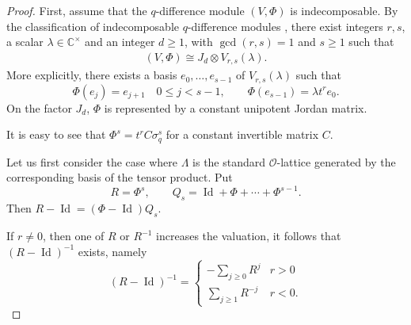 \documentclass[11pt]{amsart}
\numberwithin{equation}{section}
\theoremstyle{definition}
\theoremstyle{remark}
\begin{document}
\begin{proof}
 First, assume that the $q$-difference module $(V,\Phi)$ is indecomposable. By the classification of indecomposable $q$-difference modules \cite[Theorem~2.4]{Liu}, there exist integers $r,s$, a scalar $\lambda\in\mathbb{C}^{\times}$ and an integer $d\geq 1$, with $\gcd(r,s)=1$ and $s\geq1$ such that
\begin{align}
    (V,\Phi)\cong J_{d}\otimes V_{r,s}(\lambda).
\end{align}
More explicitly, there exists a basis $e_0,\ldots,e_{s-1}$ of $V_{r,s}(\lambda)$ such that
\[
  \Phi(e_j)=e_{j+1}\quad 0\leq j<s-1,
  \qquad
  \Phi(e_{s-1})=\lambda t^r e_0.
\]
On the factor $J_d$, $\Phi$ is represented by a constant unipotent Jordan
matrix. 

It is easy to see that $\Phi^s=t^rC\sigma_q^s$ for a constant invertible matrix $C$.

Let us first consider the case where $\Lambda$ is the standard $\mathcal O$-lattice generated by the corresponding basis of the tensor product.
Put 
\[
  R=\Phi^s, \qquad Q_s=\operatorname{Id}+\Phi+\cdots+\Phi^{s-1}.
\]
Then $R-\operatorname{Id}=(\Phi-\operatorname{Id})Q_s$. 

If $r\neq 0$, then one of $R$ or $R^{-1}$ increases the valuation, it follows that $(R-\operatorname{Id})^{-1}$ exists, namely
\[
(R-\operatorname{Id})^{-1}=
\begin{cases}
    -\sum_{j\geq0}R^j & r>0\\
    \sum_{j\geq1}R^{-j} & r<0.
\end{cases}
\]

\end{proof}
\end{document}
